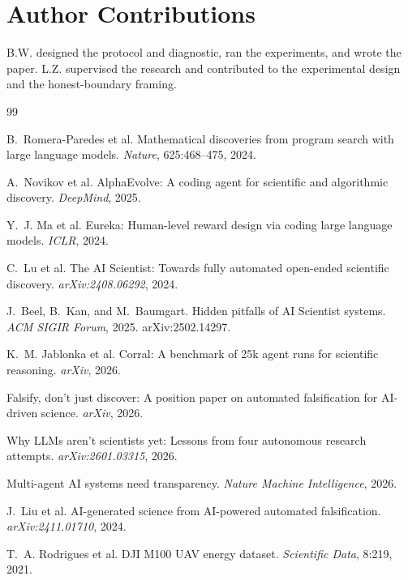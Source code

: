\documentclass{article}
\begin{document}
\section*{Author Contributions}
B.W. designed the protocol and diagnostic, ran the experiments, and wrote the paper.
L.Z. supervised the research and contributed to the experimental design and the
honest-boundary framing.

\begin{thebibliography}{99}

B.~Romera-Paredes et al.
Mathematical discoveries from program search with large language models.
\emph{Nature}, 625:468--475, 2024.

A.~Novikov et al.
AlphaEvolve: A coding agent for scientific and algorithmic discovery.
\emph{DeepMind}, 2025.

Y.~J. Ma et al.
Eureka: Human-level reward design via coding large language models.
\emph{ICLR}, 2024.

C.~Lu et al.
The AI Scientist: Towards fully automated open-ended scientific discovery.
\emph{arXiv:2408.06292}, 2024.

J.~Beel, B.~Kan, and M.~Baumgart.
Hidden pitfalls of AI Scientist systems.
\emph{ACM SIGIR Forum}, 2025. arXiv:2502.14297.

K.~M. Jablonka et al.
Corral: A benchmark of 25k agent runs for scientific reasoning.
\emph{arXiv}, 2026.

Falsify, don't just discover: A position paper on automated falsification for
AI-driven science.
\emph{arXiv}, 2026.

Why LLMs aren't scientists yet: Lessons from four autonomous research attempts.
\emph{arXiv:2601.03315}, 2026.

Multi-agent AI systems need transparency.
\emph{Nature Machine Intelligence}, 2026.

J.~Liu et al.
AI-generated science from AI-powered automated falsification.
\emph{arXiv:2411.01710}, 2024.

T.~A. Rodrigues et al.
DJI M100 UAV energy dataset.
\emph{Scientific Data}, 8:219, 2021.


\end{thebibliography}
\end{document}

